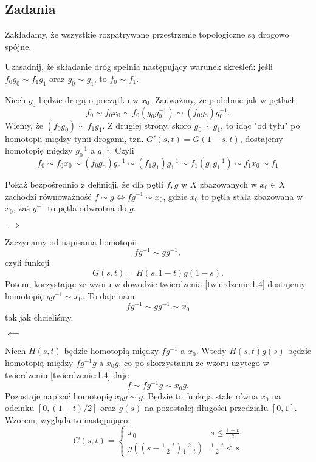 \subsection{Zadania}

Zakładamy, że wszystkie rozpatrywane przestrzenie topologiczne są drogowo spójne.

\begin{problem}
  Uzasadnij, że składanie dróg spełnia następujący warunek skreśleń: jeśli $f_0g_0\sim f_1g_1$ oraz $g_0\sim g_1$, to $f_0\sim f_1$.
\end{problem}

\begin{solution}
  Niech $g_0$ będzie drogą o początku w $x_0$. Zauważmy, że podobnie jak w pętlach
  $$f_0\sim f_0 x_0\sim f_0(g_0g_0^{-1})\sim (f_0g_0)g_0^{-1}.$$
  Wiemy, że $(f_0g_0)\sim f_1g_1$. Z drugiej strony, skoro $g_0\sim g_1$, to idąc "od tyłu" po homotopii między tymi drogami, tzn. $G'(s, t)=G(1-s, t)$, dostajemy homotopię między $g_0^{-1}$ a $g_1^{-1}$. Czyli
  $$f_0\sim f_0x_0\sim (f_0g_0)g_0^{-1}\sim (f_1g_1)g_1^{-1}\sim f_1(g_1g_1^{-1})\sim f_1x_0\sim f_1$$
\end{solution}

\begin{problem}
  Pokaż bezpośrednio z definicji, że dla pętli $f,g$ w $X$ zbazowanych w $x_0\in X$ zachodzi równoważność $f\sim g\iff f g^{-1}\sim x_0$, gdzie $x_0$ to pętla stała zbazowana w $x_0$, zaś $g^{-1}$ to pętla odwrotna do $g$.
\end{problem}

\begin{solution}
  $\implies$
  
  Zaczynamy od napisania homotopii 
  $$fg^{-1} \sim gg^{-1},$$ 
  czyli funkcji
  $$G(s, t)=H(s, 1-t)g(1-s).$$ 
  Potem, korzystając ze wzoru w dowodzie twierdzenia \ref{twierdzenie:1.4} dostajemy homotopię $gg^{-1}\sim x_0$. To daje nam 
  $$fg^{-1}\sim gg^{-1}\sim x_0$$ 
  tak jak chcieliśmy.

  $\impliedby$

  Niech $H(s, t)$ będzie homotopią między $fg^{-1}$ a $x_0$. Wtedy $H(s, t)g(s)$ będzie homotopią między $fg^{-1}g$ a $x_0g$, co po skorzystaniu ze wzoru użytego w twierdzeniu \ref{twierdzenie:1.4} daje
  $$f\sim fg^{-1}g\sim x_0g.$$
  Pozostaje napisać homotopię $x_0g\sim g$. Będzie to funkcja stale równa $x_0$ na odcinku $[0, (1-t)/2]$ oraz $g(s)$ na pozostałej długości przedziału $[0,1]$. Wzorem, wygląda to następująco:
  $$G(s, t)=\begin{cases}
  x_0&s\leq \frac{1-t}{2}\\ g\left(\left(s-\frac{1-t}{2}\right)\frac{2}{1+t}\right)&\frac{1-t}{2}<s\end{cases}$$
\end{solution}

